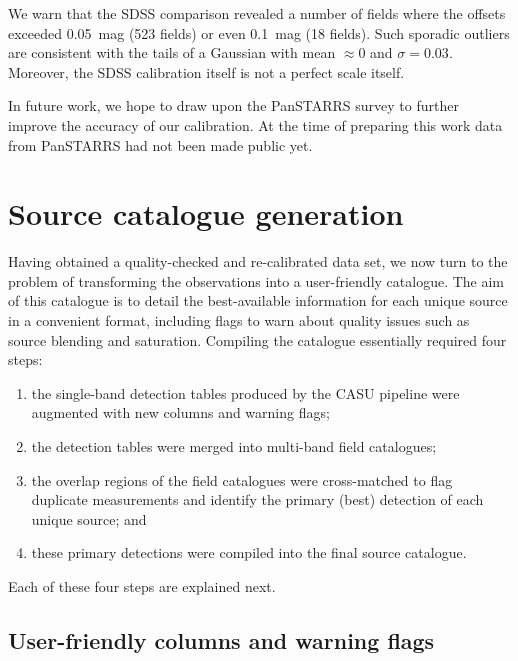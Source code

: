 \documentclass[useAMS,usenatbib]{mn2e}
\begin{document}
We warn that the SDSS comparison revealed a number of fields where the offsets
exceeded 0.05~mag (523 fields) or even 0.1~mag (18 fields).
Such sporadic outliers are consistent with the tails of a Gaussian
with mean $\approx0$ and $\sigma=0.03$.
Moreover, the SDSS calibration itself is not a perfect scale itself.

In future work, we hope to draw upon
the PanSTARRS survey \citep{Schlafly2012}
to further improve the accuracy of our calibration.
At the time of preparing this work data from PanSTARRS
had not been made public yet.

\section{Source catalogue generation}
\label{sec:catalogue}

Having obtained a quality-checked 
and re-calibrated data set, 
we now turn to the problem
of transforming the observations 
into a user-friendly catalogue.
The aim of this catalogue is to detail
the best-available information for each unique source
in a convenient format,
including flags to warn about quality issues 
such as source blending and saturation.
Compiling the catalogue essentially required four steps:
\begin{enumerate}
\item the single-band detection tables 
produced by the CASU pipeline 
were augmented with new columns
and warning flags;
\item the detection tables were merged into multi-band field catalogues;
\item the overlap regions of the field catalogues 
were cross-matched to flag duplicate measurements 
and identify the primary (best) detection 
of each unique source; and
\item these primary detections
were compiled into the final source catalogue.
\end{enumerate}
Each of these four steps are explained next.

\subsection{User-friendly columns and warning flags}
\end{document}

